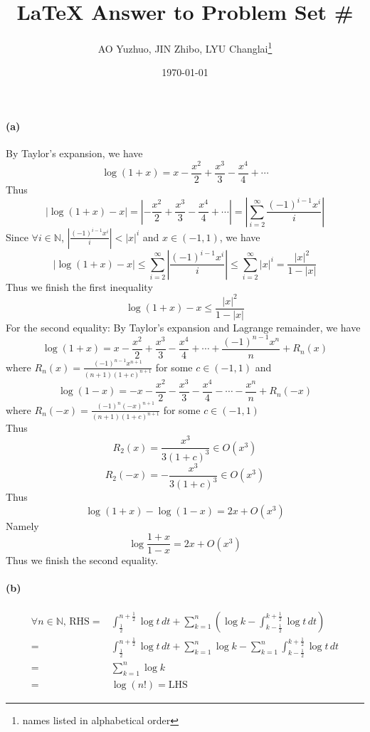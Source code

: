 \documentclass{article}
\title{\LaTeX{} Answer to Problem Set \#}
\author{AO Yuzhuo, JIN Zhibo, LYU Changlai\thanks{names listed in alphabetical order}}
\date{\today}
\begin{document}
\maketitle

\everymath{\displaystyle}

\section{}
\paragraph[short]{(a)}
{By Taylor's expansion, we have 
$$\log\left(1+x\right)=x-\frac{x^2}{2}+\frac{x^3}{3}-\frac{x^4}{4}+\cdots$$
Thus
$$|\log\left(1+x\right)-x|=\left|-\frac{x^2}{2}+\frac{x^3}{3}-\frac{x^4}{4}+\cdots\right|=\left|\sum_{i=2}^{\infty} \frac{\left(-1\right)^{i-1}x^i}{i}\right|$$
Since $\forall i\in\mathbb{N}$, $ \left|\frac{\left(-1\right)^{i-1}x^i}{i}\right|<|x|^i$ and $x\in\left(-1,1\right)$, 
we have
$$|\log\left(1+x\right)-x| \leq \sum_{i=2}^{\infty}
    \left|\frac{\left(-1\right)^{i-1}x^i}{i}\right| \leq
    \sum_{i=2}^{\infty}|x|^i=\frac{{|x|}^2}{1-|x|}
    $$
Thus we finish the first inequality
$$
\log\left(1+x\right)-x\leq\frac{{|x|}^2}{1-|x|}$$
For the second equality:
By Taylor's expansion and Lagrange remainder, we have
$$\log\left(1+x\right)=x-\frac{x^2}{2}+\frac{x^3}{3}-\frac{x^4}{4}+\cdots+\frac{\left(-1\right)^{n-1}x^n}{n}+R_n\left(x\right)$$
where $R_n\left(x\right)=\frac{\left(-1\right)^{n-1}x^{n+1}}{\left(n+1\right)\left(1+c\right)^{n+1}}$ for some $c\in\left(-1,1\right)$
and 
$$\log\left(1-x\right)=
-x-\frac{x^2}{2}-\frac{x^3}{3}-\frac{x^4}{4}-\cdots-\frac{x^n}{n}+R_n\left(-x\right)$$
where $R_n\left(-x\right)=
\frac{\left(-1\right)^{n}\left(-x\right)^{n+1}}{\left(n+1\right)\left(1+c\right)^{n+1}}$ for some $c\in\left(-1,1\right)$\\
Thus $$R_2\left(x\right)=\frac{x^3}{3\left(1+c\right)^3} \in O\left(x^3\right)$$ 
$$R_2\left(-x\right)=-\frac{x^3}{3\left(1+c\right)^3} \in O\left(x^3\right)$$
Thus 
$$\log\left(1+x\right)-\log\left(1-x\right)=2x+O\left(x^3\right)$$
Namely
$$\log\frac{1+x}{1-x}=2x+O\left(x^3\right)$$
Thus we finish the second equality.

}

\paragraph[short]{(b)}
{
    $$\begin{aligned}
        \forall n \in \mathbb{N} ,\, \text{RHS} = &\int_{\frac{1}{2}}^{n+\frac{1}{2}} \log t \, dt + \sum_{k=1}^{n}\left(\log k-\int_{k-\frac{1}{2}}^{k+\frac{1}{2}} \log t \, dt\right) \\
        = &\int_{\frac{1}{2}}^{n+\frac{1}{2}} \log t \, dt + \sum_{k=1}^{n} \log k - \sum_{k=1}^{n} \int_{k-\frac{1}{2}}^{k+\frac{1}{2}} \log t \, dt \\
        = &\sum_{k=1}^{n} \log k \\
        = &\log \left(n!\right) = \text{LHS}
    \end{aligned}$$
}
\end{document}
